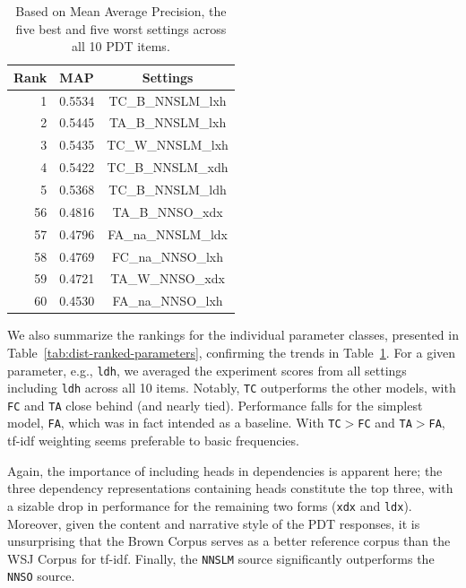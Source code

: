 \documentclass[11pt,letterpaper]{article}
\newcommand{\param}[1]{\texttt{#1}}
\begin{document}
\begin{table}[htb!]
\begin{center}
\begin{tabular}{|r|l|c|}
 \hline
 Rank & MAP & Settings \\
 \hline
 \hline
1 & 0.5534 & TC\_B\_NNSLM\_lxh \\
\hline
2 & 0.5445 & TA\_B\_NNSLM\_lxh \\
\hline
3 & 0.5435 & TC\_W\_NNSLM\_lxh \\
\hline
4 & 0.5422 & TC\_B\_NNSLM\_xdh \\
\hline
5 & 0.5368 & TC\_B\_NNSLM\_ldh \\
 \hline
 \hline
56 & 0.4816 & TA\_B\_NNSO\_xdx \\
\hline
57 & 0.4796 & FA\_na\_NNSLM\_ldx \\
\hline
58 & 0.4769 & FC\_na\_NNSO\_lxh \\
\hline
59 & 0.4721 & TA\_W\_NNSO\_xdx \\
\hline
60 & 0.4530 & FA\_na\_NNSO\_lxh \\
\hline
\end{tabular}
\caption{Based on Mean Average Precision, the five best and five worst settings across all 10 PDT items.}
\label{tab:all-dist-ranked-settings}
\end{center}
\end{table}

We also summarize the rankings for the individual parameter classes,
presented in Table~\ref{tab:dist-ranked-parameters}, confirming the
trends in Table~\ref{tab:all-dist-ranked-settings}. For a given
parameter, e.g., \param{ldh}, we averaged the experiment scores from
all settings including \param{ldh} across all 10 items. Notably, \param{TC} outperforms the other models, with \param{FC} and \param{TA} close behind (and nearly tied). Performance falls for the simplest model, \param{FA}, which was in fact intended as a baseline. With \param{TC}$>$\param{FC} and \param{TA}$>$\param{FA}, tf-idf weighting seems preferable to basic frequencies.

Again, the importance of including heads in dependencies is apparent here; the three dependency representations containing heads constitute the top three, with a sizable drop in performance for the remaining two forms (\param{xdx} and \param{ldx}). Moreover, given the content and narrative style of the PDT responses, it is unsurprising that the Brown Corpus serves as a better reference corpus than the WSJ Corpus for tf-idf. Finally, the \param{NNSLM} source significantly outperforms the \param{NNSO} source.
\end{document}
